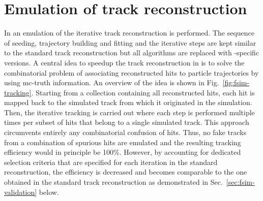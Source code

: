 \section{Emulation of track reconstruction}
\label{sec:fsim-tracking}

In \FSIM an emulation of the iterative track reconstruction is performed. The sequence of seeding, trajectory building and fitting and the iterative steps are kept similar to the standard track reconstruction but all algorithms are replaced with \FSIM-specific versions. A central idea to speedup the track reconstruction in \FSIM is to solve the combinatorial problem of associating reconstructed hits to particle trajectories by using \gls{mc}-truth information. An overview of the idea is shown in Fig.~\ref{fig:fsim-tracking}. Starting from a collection containing all reconstructed hits, each hit is mapped back to the simulated track from which it originated in the simulation. Then, the iterative tracking is carried out where each step is performed multiple times per subset of hits that belong to a single simulated track. This approach circumvents entirely any combinatorial confusion of hits. Thus, no fake tracks from a combination of spurious hits are emulated and the resulting tracking efficiency would in principle be 100\%. However, by accounting for dedicated selection criteria that are specified for each iteration in the standard reconstruction, the efficiency is decreased and becomes comparable to the one obtained in the standard track reconstruction as demonstrated in Sec.~\ref{sec:fsim-validation} below.


